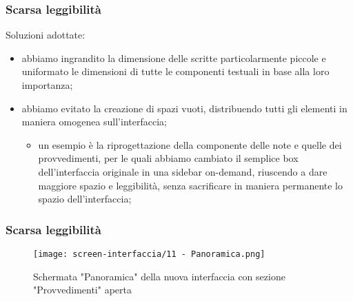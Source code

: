 \begin{frame}
    \label{f:scarsa-leggibilita}
    \frametitle{Scarsa leggibilità}    
    Soluzioni adottate: 
    \begin{itemize}
        \item<1-> abbiamo ingrandito la dimensione delle scritte particolarmente piccole e uniformato le dimensioni di tutte le componenti testuali in base alla loro importanza;
        \item<2-> abbiamo evitato la creazione di spazi vuoti, distribuendo tutti gli elementi in maniera omogenea sull'interfaccia;
        \begin{itemize}
            \item<2-> un esempio è la riprogettazione della componente delle note e quelle dei provvedimenti, per le quali abbiamo cambiato il semplice box dell'interfaccia originale in una sidebar on-demand, riuscendo a dare maggiore spazio e leggibilità, senza sacrificare in maniera permanente lo spazio dell'interfaccia;
        \end{itemize}
    \end{itemize}    

\end{frame}

\begin{frame}
    \frametitle{Scarsa leggibilità}
    \begin{figure}
        \centering
        \texttt{[image: screen-interfaccia/11 - Panoramica.png]}
        \caption{Schermata "Panoramica" della nuova interfaccia con sezione "Provvedimenti" aperta}
    \end{figure}
\end{frame}

